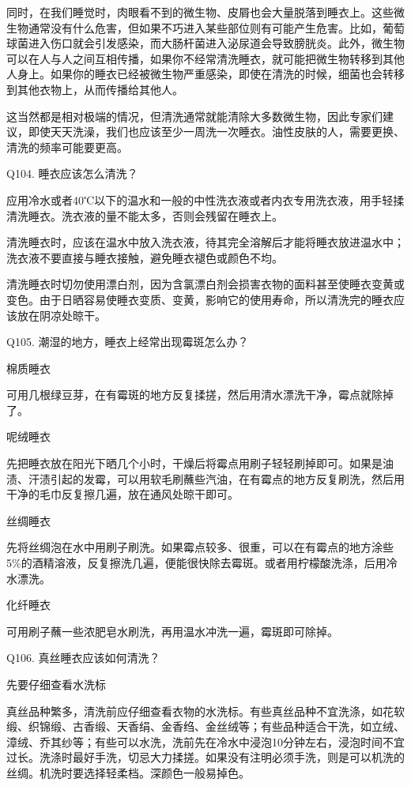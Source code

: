 \documentclass[12pt,UTF8]{ctexbook}
\begin{document}
同时，在我们睡觉时，肉眼看不到的微生物、皮屑也会大量脱落到睡衣上。这些微生物通常没有什么危害，但如果不巧进入某些部位则有可能产生危害。比如，葡萄球菌进入伤口就会引发感染，而大肠杆菌进入泌尿道会导致膀胱炎。此外，微生物可以在人与人之间互相传播，如果你不经常清洗睡衣，就可能把微生物转移到其他人身上。如果你的睡衣已经被微生物严重感染，即使在清洗的时候，细菌也会转移到其他衣物上，从而传播给其他人。

这当然都是相对极端的情况，但清洗通常就能清除大多数微生物，因此专家们建议，即使天天洗澡，我们也应该至少一周洗一次睡衣。油性皮肤的人，需要更换、清洗的频率可能要更高。





Q104. 睡衣应该怎么清洗？


应用冷水或者40℃以下的温水和一般的中性洗衣液或者内衣专用洗衣液，用手轻揉清洗睡衣。洗衣液的量不能太多，否则会残留在睡衣上。

清洗睡衣时，应该在温水中放入洗衣液，待其完全溶解后才能将睡衣放进温水中；洗衣液不要直接与睡衣接触，避免睡衣褪色或颜色不均。

清洗睡衣时切勿使用漂白剂，因为含氯漂白剂会损害衣物的面料甚至使睡衣变黄或变色。由于日晒容易使睡衣变质、变黄，影响它的使用寿命，所以清洗完的睡衣应该放在阴凉处晾干。





Q105. 潮湿的地方，睡衣上经常出现霉斑怎么办？


棉质睡衣

可用几根绿豆芽，在有霉斑的地方反复揉搓，然后用清水漂洗干净，霉点就除掉了。

呢绒睡衣

先把睡衣放在阳光下晒几个小时，干燥后将霉点用刷子轻轻刷掉即可。如果是油渍、汗渍引起的发霉，可以用软毛刷蘸些汽油，在有霉点的地方反复刷洗，然后用干净的毛巾反复擦几遍，放在通风处晾干即可。

丝绸睡衣

先将丝绸泡在水中用刷子刷洗。如果霉点较多、很重，可以在有霉点的地方涂些5\%的酒精溶液，反复擦洗几遍，便能很快除去霉斑。或者用柠檬酸洗涤，后用冷水漂洗。

化纤睡衣

可用刷子蘸一些浓肥皂水刷洗，再用温水冲洗一遍，霉斑即可除掉。





Q106. 真丝睡衣应该如何清洗？


先要仔细查看水洗标

真丝品种繁多，清洗前应仔细查看衣物的水洗标。有些真丝品种不宜洗涤，如花软缎、织锦缎、古香缎、天香绢、金香绉、金丝绒等；有些品种适合干洗，如立绒、漳绒、乔其纱等；有些可以水洗，洗前先在冷水中浸泡10分钟左右，浸泡时间不宜过长。洗涤时最好手洗，切忌大力揉搓。如果没有注明必须手洗，则是可以机洗的丝绸。机洗时要选择轻柔档。深颜色一般易掉色。
\end{document}
